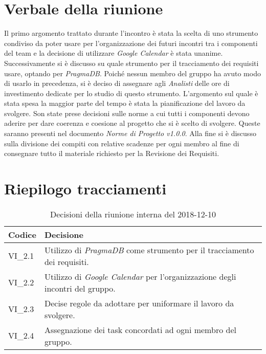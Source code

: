 \section{Verbale della riunione}
Il primo argomento trattato durante l'incontro è stata la scelta di uno strumento 
condiviso da poter usare per l'organizzazione dei futuri incontri tra i componenti
del team e la decisione di utilizzare \textit{Google Calendar} è stata unanime.
Successivamente si è discusso su quale strumento per il tracciamento dei requisiti
usare, optando per \textit{PragmaDB}\glo{}. Poiché nessun membro del gruppo ha 
avuto modo di usarlo in precedenza, si è deciso di assegnare agli \textit{Analisti}
delle ore di investimento dedicate per lo studio di questo strumento. 
L'argomento sul quale è stata spesa la maggior parte del tempo è stata la 
pianificazione del lavoro da svolgere. Son state prese decisioni sulle norme a
cui tutti i componenti devono aderire per dare coerenza e coesione al progetto
che si è scelto di svolgere. Queste saranno presenti nel documento 
\textit{Norme di Progetto v1.0.0}. Alla fine si è discusso sulla divisione dei 
compiti con relative scadenze per ogni membro al fine di consegnare tutto il 
materiale richiesto per la Revisione dei Requisiti. 
\pagebreak
\section{Riepilogo tracciamenti}

	
\begin{longtable}{ >{\centering}p{} >{}p{}}
	\caption{Decisioni della riunione interna del 2018-12-10}\\	
	\rowcolorhead
	\textbf{\color{white}Codice} 
	& \centering\textbf{\color{white}Decisione} 
	\tabularnewline 
	\endfirsthead
		VI\_2.1 & Utilizzo di \textit{PragmaDB} come strumento per il tracciamento dei
				requisiti.
		
		\tabularnewline 
		VI\_2.2 & Utilizzo di \textit{Google Calendar} per l'organizzazione degli 
				incontri del gruppo.
		
		\tabularnewline 
		VI\_2.3 & Decise regole da adottare per uniformare il lavoro da svolgere.
	
		\tabularnewline 
		VI\_2.4 & Assegnazione dei task concordati ad ogni membro del gruppo.
	
	\end{longtable}
	



